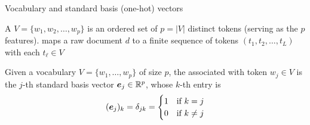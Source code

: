 \documentclass[aspectratio=169]{beamer}\usepackage[]{graphicx}\usepackage[]{xcolor}
\begin{document}
\begin{frame}{Vocabulary and standard basis (one-hot) vectors}
\begin{importantdefinition}
A  $V = \{w_1, w_2, \ldots, w_p\}$ is an ordered set of $p = |V|$ distinct tokens (serving as the $p$ features).  maps a raw document $d$ to a finite sequence of tokens $(t_1, t_2, \ldots, t_L)$ with each $t_\ell \in V$
\end{importantdefinition}
\vfill
\begin{importantdefinition}
Given a vocabulary $V = \{w_1, \ldots, w_p\}$ of size $p$, the  associated with token $w_j \in V$ is the $j$-th standard basis vector $\bm{e}_j \in \mathbb{R}^p$, whose $k$-th entry is
\[
(\bm{e}_j)_k = \delta_{jk} =
\begin{cases}
1 & \textrm{if } k = j \\
0 & \textrm{if } k \neq j
\end{cases}
\]
\end{importantdefinition}
\end{frame}
\end{document}
